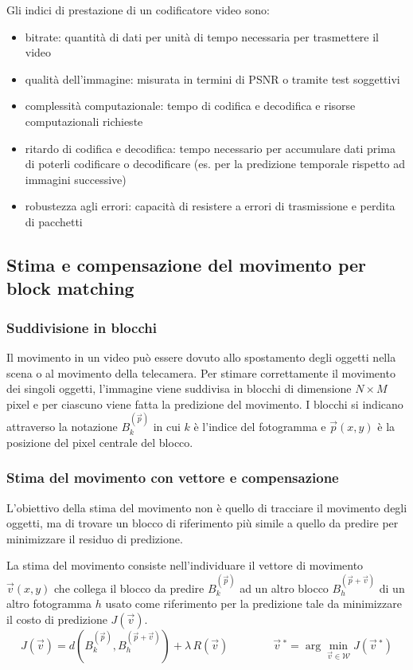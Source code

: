 \noindent
Gli indici di prestazione di un codificatore video sono:
\begin{itemize}
	\item bitrate: quantità di dati per unità di tempo necessaria per trasmettere il video
	\item qualità dell'immagine: misurata in termini di PSNR o tramite test soggettivi
	\item complessità computazionale: tempo di codifica e decodifica e risorse computazionali richieste
	\item ritardo di codifica e decodifica: tempo necessario per accumulare dati prima di poterli codificare
	o decodificare (es. per la predizione temporale rispetto ad immagini successive)
	\item robustezza agli errori: capacità di resistere a errori di trasmissione e perdita di pacchetti
\end{itemize}

\subsection{Stima e compensazione del movimento per block matching}
\subsubsection*{Suddivisione in blocchi}
Il movimento in un video può essere dovuto allo spostamento degli oggetti nella scena o al movimento della telecamera.
Per stimare correttamente il movimento dei singoli oggetti, l'immagine viene suddivisa in blocchi di dimensione \(N \times M\)
pixel e per ciascuno viene fatta la predizione del movimento. I blocchi si indicano attraverso la notazione \(B_{k}^{(\vec{p})}\)
in cui \(k\) è l'indice del fotogramma e \(\vec{p}(x,y)\) è la posizione del pixel centrale del blocco.

\subsubsection*{Stima del movimento con vettore e compensazione}
L'obiettivo della stima del movimento non è quello di tracciare il movimento degli oggetti, ma di trovare un blocco di
riferimento più simile a quello da predire per minimizzare il residuo di predizione.

La stima del movimento consiste nell'individuare il vettore di movimento \(\vec{v}(x,y)\) che collega il blocco da
predire \(B_k^{(\vec{p})}\) ad un altro blocco \(B_h^{(\vec{p} + \vec{v})}\) di un altro fotogramma \(h\) usato come
riferimento per la predizione tale da minimizzare il costo di predizione \(J(\vec{v})\).
\[J(\vec{v}) = d\left( B_k^{(\vec{p})}, B_h^{(\vec{p} + \vec{v})} \right) + \lambda \, R(\vec{v}) \qquad\qquad \vec{v}\,^* = \arg\min_{\vec{v} \in \mathcal{W}} J(\vec{v}\,^*)\]

